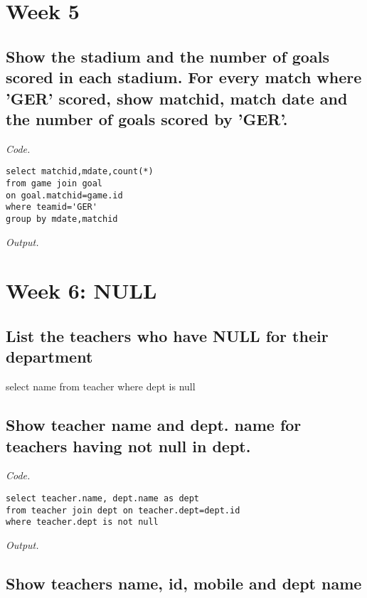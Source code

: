 \documentclass[12pt]{article}
\begin{document}
\section{Week 5}

\subsection{Show the stadium and the number of goals scored in each stadium. For every match where 'GER' scored, show matchid, match date and the number of goals scored by 'GER'.}

\textit{Code.}

\begin{lstlisting}
select matchid,mdate,count(*)
from game join goal 
on goal.matchid=game.id
where teamid='GER'
group by mdate,matchid
\end{lstlisting}

\textit{Output.}\\

\section{Week 6: NULL}

\subsection{List the teachers who have NULL for their department}

select name from teacher
where dept is null

\subsection{Show teacher name and dept. name for teachers having not null in dept.}

\textit{Code.}

\begin{lstlisting}[showstringspaces=false]
select teacher.name, dept.name as dept
from teacher join dept on teacher.dept=dept.id
where teacher.dept is not null
\end{lstlisting}

\textit{Output.}\\

\subsection{Show teachers name, id, mobile and dept name}
\end{document}

